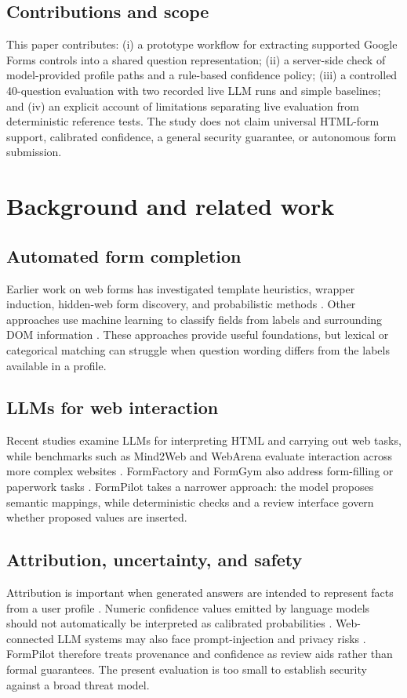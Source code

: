\documentclass[]{einformatica}
\begin{document}
\subsection{Contributions and scope}
This paper contributes: (i) a prototype workflow for extracting supported Google Forms controls into a shared question representation; (ii) a server-side check of model-provided profile paths and a rule-based confidence policy; (iii) a controlled 40-question evaluation with two recorded live LLM runs and simple baselines; and (iv) an explicit account of limitations separating live evaluation from deterministic reference tests. The study does not claim universal HTML-form support, calibrated confidence, a general security guarantee, or autonomous form submission.

\section{Background and related work}\label{sec:Background}

\subsection{Automated form completion}
Earlier work on web forms has investigated template heuristics, wrapper induction, hidden-web form discovery, and probabilistic methods \cite{toda2010probabilistic,winckler2014approach,kantorski2015automatic}. Other approaches use machine learning to classify fields from labels and surrounding DOM information \cite{bose2019field,belgacem2024machine}. These approaches provide useful foundations, but lexical or categorical matching can struggle when question wording differs from the labels available in a profile.

\subsection{LLMs for web interaction}
Recent studies examine LLMs for interpreting HTML and carrying out web tasks, while benchmarks such as Mind2Web and WebArena evaluate interaction across more complex websites \cite{gur2023understanding,deng2023mind2web,zhou2024webarena}. FormFactory and FormGym also address form-filling or paperwork tasks \cite{li2025formfactory,toles2024formgym}. FormPilot takes a narrower approach: the model proposes semantic mappings, while deterministic checks and a review interface govern whether proposed values are inserted.

\subsection{Attribution, uncertainty, and safety}
Attribution is important when generated answers are intended to represent facts from a user profile \cite{rashkin2023measuring}. Numeric confidence values emitted by language models should not automatically be interpreted as calibrated probabilities \cite{xiong2024can}. Web-connected LLM systems may also face prompt-injection and privacy risks \cite{greshake2023not}. FormPilot therefore treats provenance and confidence as review aids rather than formal guarantees. The present evaluation is too small to establish security against a broad threat model.
\end{document}
